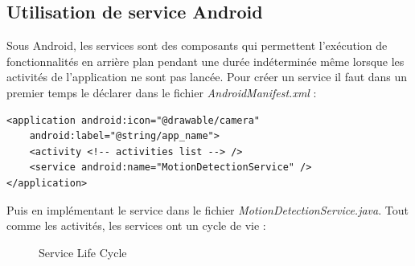 \subsection{Utilisation de service Android}
Sous Android, les services sont des composants qui permettent l'exécution de
fonctionnalités en arrière plan pendant une durée indéterminée même lorsque les
activités de l'application ne sont pas lancée.
Pour créer un service il faut dans un premier temps le déclarer dans le fichier
\textit{AndroidManifest.xml} :\newline
\begin{lstlisting}[format=XML]
<application android:icon="@drawable/camera" 
	android:label="@string/app_name">
	<activity <!-- activities list --> />
	<service android:name="MotionDetectionService" />
</application>
\end{lstlisting}
Puis en implémentant le service dans le fichier
\textit{MotionDetectionService.java}.
 Tout comme les activités, les services ont
un cycle de vie :
\newline
\begin{center}
\begin{figure}[H]
   \label{serviceLifecycle}
  \centering
   \caption{Service Life Cycle \protect\footnotemark}
  \end{figure}
  \end{center}

